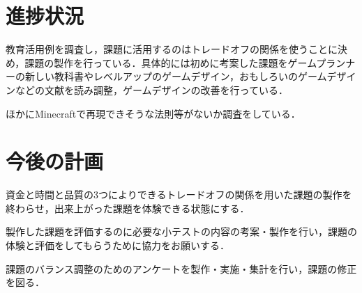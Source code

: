 \documentclass[uplatex,twocolumn,dvipdfmx]{jsarticle}
\begin{document}
\section{進捗状況}
教育活用例を調査し，課題に活用するのはトレードオフの関係を使うことに決め，課題の製作を行っている．具体的には初めに考案した課題をゲームプランナーの新しい教科書やレベルアップのゲームデザイン，おもしろいのゲームデザインなどの文献を読み調整，ゲームデザインの改善を行っている．


ほかにMinecraftで再現できそうな法則等がないか調査をしている．



\section{今後の計画}
資金と時間と品質の3つによりできるトレードオフの関係を用いた課題の製作を終わらせ，出来上がった課題を体験できる状態にする．


製作した課題を評価するのに必要な小テストの内容の考案・製作を行い，課題の体験と評価をしてもらうために協力をお願いする．


課題のバランス調整のためのアンケートを製作・実施・集計を行い，課題の修正を図る．





\end{document}
